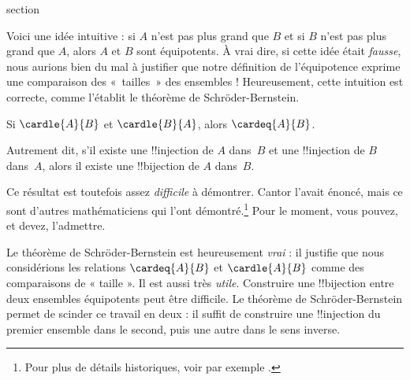 \documentclass[11pt,a4paper,openany]{memoir}
\begin{document}
\endgroup



\begingroup
\expandafter\def\csname ol@sectioncs\endcsname{section}
\def\olfilename{schroder-bernstein}




\begin{explain}
Voici une idée intuitive : si $A$ n'est pas plus grand que $B$ et
si $B$ n'est pas plus grand que $A$, alors $A$ et $B$ sont
équipotents. À vrai dire, si cette idée était \emph{fausse}, nous
aurions bien du mal à justifier que notre définition de l'équipotence
exprime une comparaison des «~tailles~» des ensembles !{} Heureusement,
cette intuition est correcte, comme l'établit le théorème de
Schr\"oder-Bernstein.
\end{explain}

\begin{thm}
  Si $\cardle{A}{B}$ et $\cardle{B}{A}$, alors $\cardeq{A}{B}$.
\end{thm}

\begin{explain}
Autrement dit, s'il existe une !!{injection} de $A$ dans~$B$ et
une !!{injection} de $B$ dans~$A$, alors il existe une
!!{bijection} de $A$ dans~$B$.

Ce résultat est toutefois assez \emph{difficile} à démontrer. Cantor
l'avait énoncé, mais ce sont d'autres mathématiciens qui l'ont
démontré.\footnote{Pour plus de détails historiques, voir par exemple
\citet[pp.~165--6]{Potter2004}.}
%
Pour le moment, vous pouvez, et devez, l'admettre.

Le théorème de Schr\"oder-Bernstein est heureusement \emph{vrai} :
il justifie que nous considérions les relations $\cardeq{A}{B}$
et $\cardle{A}{B}$ comme des comparaisons de « taille ». Il est
aussi très \emph{utile}. Construire une !!{bijection} entre deux
ensembles équipotents peut être difficile. Le théorème de
Schr\"oder-Bernstein permet de scinder ce travail en deux :
il suffit de construire une !!{injection} du premier ensemble
dans le second, puis une autre dans le sens inverse.
\end{explain}
\end{document}
